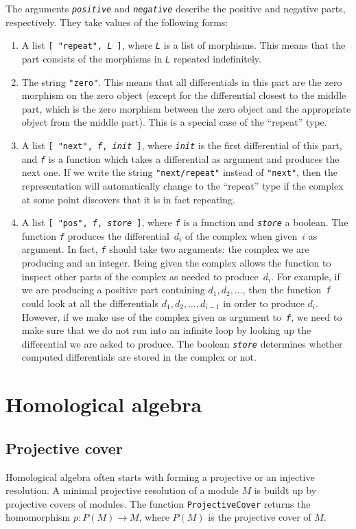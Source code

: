 \documentclass{amsart}
\theoremstyle{definition}
\newcommand{\code}[1]{\texttt{#1}}
\newcommand{\Arg}[1]{\texttt{\textit{#1}}}
\theoremstyle{theoretic}
\begin{document}
The arguments \Arg{positive} and \Arg{negative} describe the positive
and negative parts, respectively.  They take values of the following
forms:
\begin{enumerate}
\item A list \code{[ "repeat", \Arg{L} ]}, where \Arg{L} is a list of
morphisms.  This means that the part consists of the morphisms in
\Arg{L} repeated indefinitely.
\item The string \code{"zero"}.  This means that all differentials in
this part are the zero morphism on the zero object (except for the
differential closest to the middle part, which is the zero morphism
between the zero object and the appropriate object from the middle
part).  This is a special case of the ``repeat'' type.
\item A list \code{[ "next", \Arg{f}, \Arg{init} ]}, where \Arg{init}
is the first differential of this part, and \Arg{f} is a function
which takes a differential as argument and produces the next one.  If
we write the string \code{"next/repeat"} instead of \code{"next"},
then the representation will automatically change to the ``repeat''
type if the complex at some point discovers that it is in fact
repeating.
\item A list \code{[ "pos", \Arg{f}, \Arg{store} ]}, where \Arg{f} is
a function and \Arg{store} a boolean.  The function \Arg{f} produces
the differential~$d_i$ of the complex when given~$i$ as argument.  In
fact, \Arg{f} should take two arguments: the complex we are producing
and an integer.  Being given the complex allows the function to
inspect other parts of the complex as needed to produce~$d_i$.  For
example, if we are producing a positive part containing $d_1, d_2,
\ldots$, then the function~\Arg{f} could look at all the differentials
$d_1, d_2, \ldots, d_{i-1}$ in order to produce $d_i$.  However, if we
make use of the complex given as argument to~\Arg{f}, we need to make
sure that we do not run into an infinite loop by looking up the
differential we are asked to produce.  The boolean \Arg{store}
determines whether computed differentials are stored in the complex or
not.
\end{enumerate}

\section{Homological algebra}
\subsection{Projective cover}
Homological algebra often starts with forming a projective or an
injective resolution.  A minimal projective resolution of a module $M$
is buildt up by projective covers of modules.  The function
\code{ProjectiveCover} returns the homomorphism $p\colon P(M)\to M$,
where $P(M)$ is the projective cover of $M$.  
\end{document}
